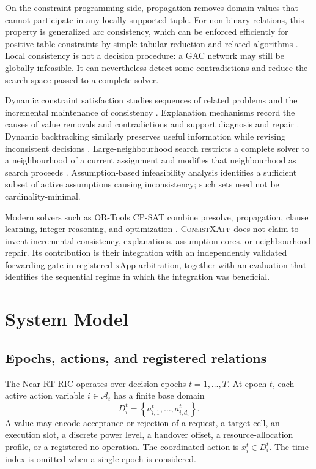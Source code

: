 \documentclass[pdflatex,sn-mathphys-num,iicol,oneside]{sn-jnl}
\newcommand{\method}{\textsc{ConsistXApp}\xspace}
\newcommand{\gac}{\textsc{GAC}\xspace}
\newcommand{\cpsat}{\textsc{CP-SAT}\xspace}
\begin{document}
On the constraint-programming side, propagation removes domain values
that cannot participate in any locally supported tuple. For
non-binary relations, this property is generalized arc consistency,
which can be enforced efficiently for positive table constraints by
simple tabular reduction and related algorithms
\cite{yap2020gac,lecoutre2011str2}. Local consistency is not a
decision procedure: a \gac network may still be globally infeasible.
It can nevertheless detect some contradictions and reduce the search
space passed to a complete solver.

Dynamic constraint satisfaction studies sequences of related
problems and the incremental maintenance of consistency
\cite{bessiere1991dynamic}. Explanation mechanisms record the causes
of value removals and contradictions and support diagnosis and
repair \cite{gupta2021explanations}. Dynamic backtracking
similarly preserves useful information while revising inconsistent
decisions \cite{ginsberg1993dynamic}. Large-neighbourhood search restricts a
complete solver to a neighbourhood of a current assignment and
modifies that neighbourhood as search proceeds
\cite{shaw1998lns}. Assumption-based infeasibility analysis identifies
a sufficient subset of active assumptions causing inconsistency; such
sets need not be cardinality-minimal.

Modern solvers such as OR-Tools \cpsat combine presolve, propagation,
clause learning, integer reasoning, and optimization
\cite{perron2023cpsat,ortools}. \method does not claim to invent
incremental consistency, explanations, assumption cores, or
neighbourhood repair. Its contribution is their integration with an
independently validated forwarding gate in registered xApp
arbitration, together with an evaluation that identifies the
sequential regime in which the integration was beneficial.

\section{System Model}
\label{sec:model}

\subsection{Epochs, actions, and registered relations}

The Near-RT RIC operates over decision epochs
$t=1,\ldots,T$. At epoch $t$, each active action variable
$i\in\mathcal{A}_t$ has a finite base domain
\begin{equation}
D_i^t=
\left\{
a_{i,1}^t,\ldots,a_{i,d_i}^t
\right\}.
\end{equation}
A value may encode acceptance or rejection of a request, a target
cell, an execution slot, a discrete power level, a handover offset, a
resource-allocation profile, or a registered no-operation. The
coordinated action is $x_i^t\in D_i^t$. The time index is omitted when
a single epoch is considered.
\end{document}

